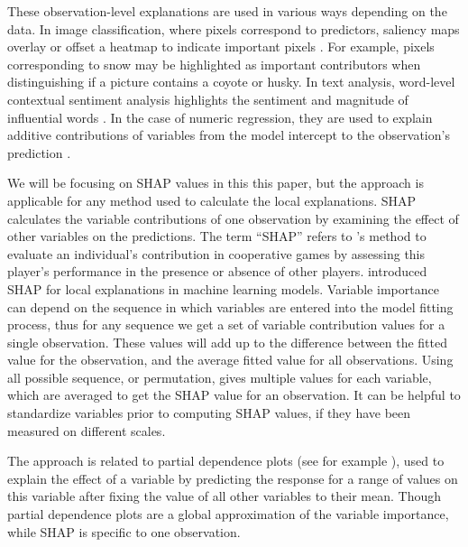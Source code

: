 \documentclass[
]{jss}
\begin{document}
These observation-level explanations are used in various ways depending
on the data. In image classification, where pixels correspond to
predictors, saliency maps overlay or offset a heatmap to indicate
important pixels \citep{simonyan_deep_2014}. For example, pixels
corresponding to snow may be highlighted as important contributors when
distinguishing if a picture contains a coyote or husky. In text
analysis, word-level contextual sentiment analysis highlights the
sentiment and magnitude of influential words \citep{vanni_textual_2018}.
In the case of numeric regression, they are used to explain additive
contributions of variables from the model intercept to the observation's
prediction \citep{ribeiro_why_2016}.

We will be focusing on SHAP values in this this paper, but the approach
is applicable for any method used to calculate the local explanations.
SHAP calculates the variable contributions of one observation by
examining the effect of other variables on the predictions. The term
``SHAP'' refers to \citet{shapley_value_1953}'s method to evaluate an
individual's contribution in cooperative games by assessing this
player's performance in the presence or absence of other players.
\citet{strumbelj_efficient_2010} introduced SHAP for local explanations
in machine learning models. Variable importance can depend on the
sequence in which variables are entered into the model fitting process,
thus for any sequence we get a set of variable contribution values for a
single observation. These values will add up to the difference between
the fitted value for the observation, and the average fitted value for
all observations. Using all possible sequence, or permutation, gives
multiple values for each variable, which are averaged to get the SHAP
value for an observation. It can be helpful to standardize variables
prior to computing SHAP values, if they have been measured on different
scales.

The approach is related to partial dependence plots (see for example
\citet{molnar_interpretable_2020}), used to explain the effect of a
variable by predicting the response for a range of values on this
variable after fixing the value of all other variables to their mean.
Though partial dependence plots are a global approximation of the
variable importance, while SHAP is specific to one observation.
\end{document}
